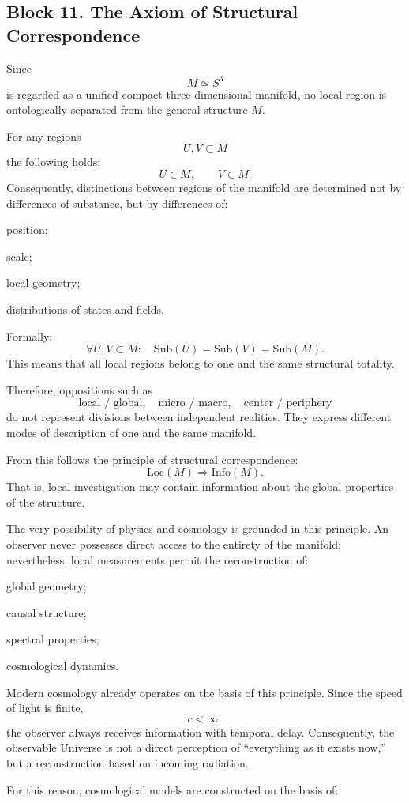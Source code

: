 \documentclass[12pt,a4paper]{article}
\theoremstyle{definition}
\begin{document}
\subsection{Block 11. The Axiom of Structural Correspondence}
Since
\[
M\simeq S^3
\]
is regarded as a unified compact three-dimensional manifold, no local region is ontologically separated from the general structure \(M\).

For any regions
\[
U,V\subset M
\]
the following holds:
\[
U\in M,
\qquad
V\in M.
\]
Consequently, distinctions between regions of the manifold are determined not by differences of substance, but by differences of:

position;

scale;

local geometry;

distributions of states and fields.

Formally:
\[
\forall U,V\subset M:\quad
\mathrm{Sub}(U)=\mathrm{Sub}(V)=\mathrm{Sub}(M).
\]
This means that all local regions belong to one and the same structural totality.

Therefore, oppositions such as
\[
\text{local / global},
\quad
\text{micro / macro},
\quad
\text{center / periphery}
\]
do not represent divisions between independent realities. They express different modes of description of one and the same manifold.

From this follows the principle of structural correspondence:
\[
\mathrm{Loc}(M)\Longrightarrow \mathrm{Info}(M).
\]
That is, local investigation may contain information about the global properties of the structure.

The very possibility of physics and cosmology is grounded in this principle. An observer never possesses direct access to the entirety of the manifold; nevertheless, local measurements permit the reconstruction of:

global geometry;

causal structure;

spectral properties;

cosmological dynamics.

Modern cosmology already operates on the basis of this principle. Since the speed of light is finite,
\[
c<\infty,
\]
the observer always receives information with temporal delay. Consequently, the observable Universe is not a direct perception of ``everything as it exists now,'' but a reconstruction based on incoming radiation.

For this reason, cosmological models are constructed on the basis of:
\end{document}
